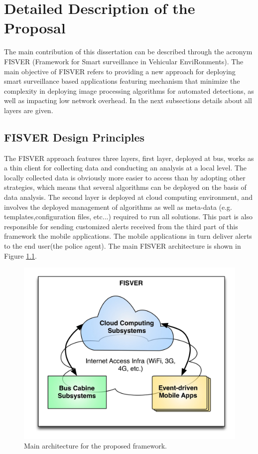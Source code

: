 \chapter{Detailed Description of the Proposal}

The main contribution of this dissertation can be described through the acronym FISVER (Framework for Smart surveillance in Vehicular EnviRonments). The main objective of FISVER refers to providing a new approach for deploying smart surveillance based  applications featuring mechanism that minimize the complexity in deploying image processing algorithms for automated detections, as well as impacting low network overhead. In the next subsections details about all layers are given.

\section{FISVER Design Principles}

The FISVER approach features three layers, first layer, deployed at bus, works as a thin client for collecting data and conducting an analysis at a local level. The locally collected data is obviously more easier to access than by adopting other strategies, which means that several algorithms can be deployed on the basis of data analysis. The second layer is deployed at cloud computing environment, and involves the deployed management of algorithms as well as meta-data (e.g. templates,configuration files, etc...) required to run all solutions. This part is also responsible for sending customized alerts received from the third part of this framework  the mobile applications. The mobile applications in turn deliver alerts to the end user(the police agent). The main FISVER architecture is shown in Figure \ref{fig:arch}.


\begin{figure}[htb!]
 	\centering
 	\includegraphics[scale=0.20]{Imagens/cap4_arch.png}
 	\caption{Main architecture for the proposed framework.}
 	\label{fig:arch}
\end{figure}

